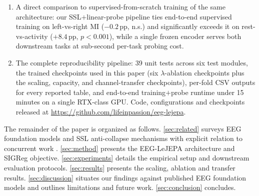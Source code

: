 \begin{enumerate}
\item A direct comparison to supervised-from-scratch training of the same
architecture: our SSL$+$linear-probe pipeline ties end-to-end supervised
training on left-vs-right MI ($-0.2$\,pp, n.s.) and significantly exceeds
it on rest-vs-activity ($+8.4$\,pp, $p<0.001$), while a single frozen
encoder serves both downstream tasks at sub-second per-task probing cost.

\item The complete reproducibility pipeline: 39 unit tests across six
test modules, the trained checkpoints used in this paper (six
$\lambda$-ablation checkpoints plus the scaling, capacity, and
channel-transfer checkpoints), per-fold CSV outputs for every reported
table, and end-to-end training$+$probe runtime under 15 minutes on a
single RTX-class GPU. Code, configurations and checkpoints released
at \url{https://github.com/lifeinpassion/eeg-lejepa}.
\end{enumerate}

The remainder of the paper is organized as follows.
\cref{sec:related} surveys EEG foundation models and SSL anti-collapse
mechanisms with explicit relation to concurrent work
\cite{laya2026}. \cref{sec:method} presents the EEG-LeJEPA architecture
and SIGReg objective. \cref{sec:experiments} details the empirical setup
and downstream evaluation protocols. \cref{sec:results} presents the
scaling, ablation and transfer results. \cref{sec:discussion} situates
our findings against published EEG foundation models and outlines
limitations and future work. \cref{sec:conclusion} concludes.
